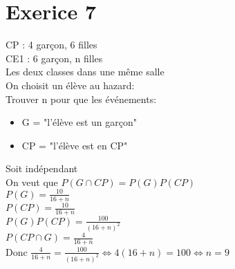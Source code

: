 \documentclass{article}
\author{Frederic Becerril}
\begin{document}
\part*{Exerice 7}
CP : 4 garçon, 6 filles\\
CE1 : 6 garçon, n filles\\
Les deux classes dans une même salle\\
On choisit un élève au hazard:\\
Trouver n pour que les événements:
\begin{itemize}
    \item G = "l'élève est un garçon"
    \item CP = "l'élève est en CP"
\end{itemize}
Soit indépendant\\
On veut que $P(G \cap CP) = P(G)P(CP)$\\
$P(G) = \frac{10}{16 + n}$\\
$P(CP) = \frac{10}{16 + n}$\\
$P(G) P(CP) = \frac{100}{(16 + n)^2}$\\
$P(CP \cap G) = \frac{4}{16 + n}$\\
Donc $\frac{4}{16 + n} = \frac{100}{(16 + n)^2} \Leftrightarrow 4(16 + n) = 100 \Leftrightarrow n = 9$
\end{document}
